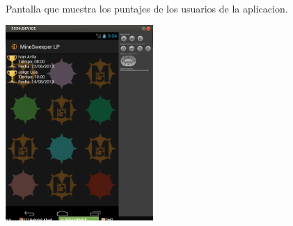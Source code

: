 \documentclass[../documentacion_buscaminas2013.tex]{subfiles}
\begin{document}
\begin{figure}
\paragraph{ } Pantalla que muestra los puntajes de los usuarios de la aplicacion.
 \newline
	~\newline
	\begin{center}
		\includegraphics[width=0.5\textwidth]{./images/ranking.png}
	\end{center}
	

\end{figure}

\clearpage
\end{document}
